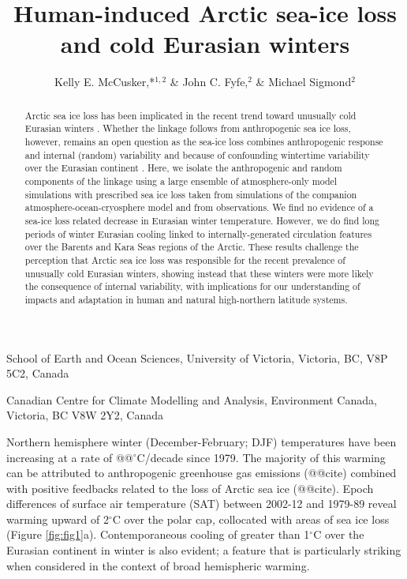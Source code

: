 \documentclass{nature}
\title{Human-induced Arctic sea-ice loss and cold Eurasian winters}
\author{Kelly E. McCusker,*$^{1,2}$ \& John C. Fyfe,$^{2}$ \& Michael Sigmond$^2$}
\begin{document}
\maketitle

\begin{affiliations}
 \item School of Earth and Ocean Sciences, University of Victoria, Victoria, BC, V8P 5C2, Canada
 \item Canadian Centre for Climate Modelling and Analysis, Environment Canada, Victoria, BC V8W 2Y2, Canada
\end{affiliations}


\begin{abstract}
Arctic sea ice loss has been implicated in the recent trend toward unusually cold Eurasian winters \cite{liu12,mori14,kim14}. Whether the linkage follows from anthropogenic sea ice loss, however, remains an open question as the sea-ice loss combines anthropogenic response and internal (random) variability \cite{swart15,wettstein14} and because of confounding wintertime variability over the Eurasian continent \cite{deser12b,screen14a}. Here, we isolate the anthropogenic and random components of the linkage using a large ensemble of atmosphere-only model simulations with prescribed sea ice loss taken from simulations of the companion atmosphere-ocean-cryosphere model and from observations. We find no evidence of a sea-ice loss related decrease in Eurasian winter temperature. However, we do find long periods of winter Eurasian cooling linked to internally-generated circulation features over the Barents and Kara Seas regions of the Arctic. These results challenge the perception that Arctic sea ice loss was responsible for the recent prevalence of unusually cold Eurasian winters, showing instead that these winters were more likely the consequence of internal variability, with implications for our understanding of impacts and adaptation in human and natural high-northern latitude systems. %
\end{abstract}

Northern hemisphere winter (December-February; DJF) temperatures have been increasing at a rate of @@$^\circ$C/decade since 1979. The majority of this warming can be attributed to anthropogenic greenhouse gas emissions (@@cite) combined with positive feedbacks related to the loss of Arctic sea ice (@@cite). Epoch differences of surface air temperature (SAT) between 2002-12 and 1979-89 reveal warming upward of 2$^\circ$C over the polar cap, collocated with areas of sea ice loss (Figure \ref{fig:fig1}a). Contemporaneous cooling of greater than 1$^\circ$C over the Eurasian continent in winter is also evident; a feature that is particularly striking when considered in the context of broad hemispheric warming. 
\end{document}
